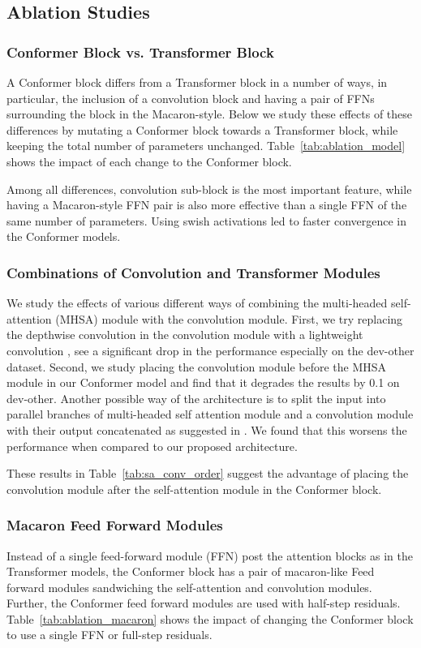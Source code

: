 \subsection{Ablation Studies}

\subsubsection{Conformer Block vs. Transformer Block}
\label{ablate_conformer_transformer}
A Conformer block differs from a Transformer block in a number of ways, in particular, the inclusion of a convolution block and having a pair of FFNs surrounding the block in the Macaron-style. Below we study these effects of these differences by mutating a Conformer block towards a Transformer block, while keeping the total number of parameters unchanged. Table~\ref{tab:ablation_model} shows the impact of each change to the Conformer block.

Among all differences, convolution sub-block is the most important feature, while having a Macaron-style FFN pair is also more effective than a single FFN of the same number of parameters. Using swish activations led to faster convergence in the Conformer models.

\subsubsection{Combinations of Convolution and Transformer Modules}
\label{ablate_conformer_convolution}
We study the effects of various different ways of combining the multi-headed self-attention (MHSA) module with the convolution module. First, we try replacing the depthwise convolution in the convolution module with a lightweight convolution \cite{wu2019pay}, see a significant drop in the performance  especially on the dev-other dataset. Second, we study placing the convolution module before the MHSA module in our Conformer model and find that it degrades the results by 0.1 on dev-other. Another possible way of the architecture is to split the input into parallel branches of multi-headed self attention module and a convolution module with their output concatenated as suggested in \cite{wu2020lite}. We found that this worsens the performance when compared to our proposed architecture.

These results in Table~\ref{tab:sa_conv_order} suggest the advantage of placing the convolution module after the self-attention module in the Conformer block.

\subsubsection{Macaron Feed Forward Modules}
\label{ablate_conformer_macaron}
Instead of a single feed-forward module (FFN) post the attention blocks as in the Transformer models, the Conformer block has a pair of macaron-like Feed forward modules sandwiching the self-attention and convolution modules. Further, the Conformer feed forward modules are used with half-step residuals.
Table~\ref{tab:ablation_macaron} shows the impact of changing the Conformer block to use a single FFN or full-step residuals.

